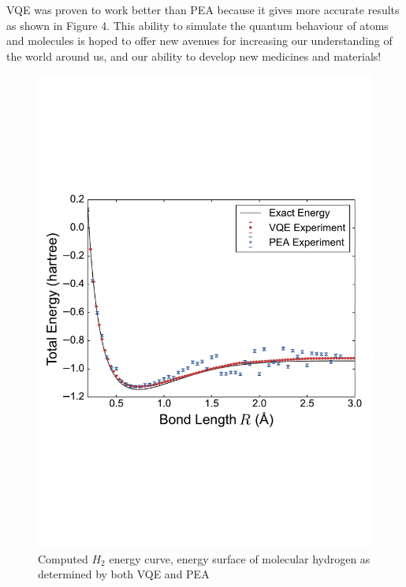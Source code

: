 \documentclass[14pt,landscape,color=UCLdarkred,margin=3cm]{uclposter}
\begin{document}
\begin{multicols}{3}
VQE was proven to work better than PEA because it gives more accurate results as shown in Figure 4. This ability to simulate the quantum behaviour of atoms and molecules is hoped to offer new avenues for increasing our understanding of the world around us, and our ability to develop new medicines and materials!

\begin{figure}[H]
  \begin{center}
  \includegraphics[scale=1.2]{result.pdf}
  \caption{Computed $H_2$ energy curve, energy surface of molecular hydrogen as determined by both VQE and PEA}
  \end{center}
    
 

   
\end{figure}



\end{multicols}
	
\end{document}

